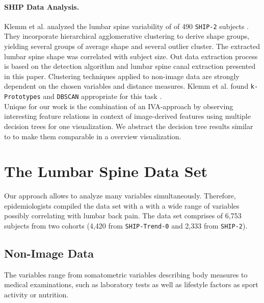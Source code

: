 \documentclass[a4paper,twoside]{style/article}
\newcommand{\com}[1]{\textcolor{orange}{\uline{#1}}}
\begin{document}
\paragraph{SHIP Data Analysis.}
Klemm et al. analyzed the lumbar spine variability of of 490 \texttt{SHIP-2} subjects \cite{Klemm2013VMV}.
They incorporate hierarchical agglomerative clustering to derive shape groups, yielding several groups of average shape and several outlier cluster.
The extracted lumbar spine shape was correlated with subject size.
Out data extraction process is based on the detection algorithm and lumbar spine canal extraction presented in this paper.
Clustering techniques applied to non-image data are strongly dependent on the chosen variables and distance measures.
Klemm et al. found \texttt{k-Prototypes} and \texttt{DBSCAN} appropriate for this task \cite{Klemm2014BVM}.
\\
Unique for our work is the combination of an IVA-approach by observing interesting feature relations in context of image-derived features using multiple decision trees for one visualization.
We abstract the decision tree results similar to \cite{Turkay} to make them comparable in a overview visualization.
\section{The Lumbar Spine Data Set}
\label{sec:MaterialsAndMethod}
\noindent Our approach allows to analyze many variables simultaneously.
Therefore, epidemiologists compiled the data set with a with a wide range of variables possibly correlating with lumbar back pain.
The data set comprises of 6,753 subjects from two cohorts (4,420 from \texttt{SHIP-Trend-0} and 2,333 from \texttt{SHIP-2}).

\subsection{Non-Image Data}
The variables range from somatometric variables describing body measures to medical examinations, such as laboratory tests as well as lifestyle factors as sport activity or nutrition.
\end{document}
